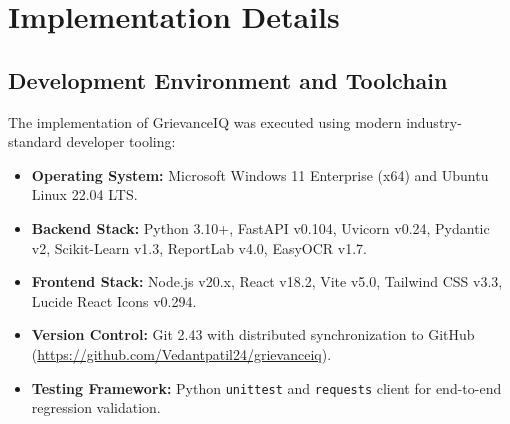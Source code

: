 \chapter{Implementation Details}

\section{Development Environment and Toolchain}
The implementation of GrievanceIQ was executed using modern industry-standard developer tooling:
\begin{itemize}
    \item \textbf{Operating System:} Microsoft Windows 11 Enterprise (x64) and Ubuntu Linux 22.04 LTS.
    \item \textbf{Backend Stack:} Python 3.10+, FastAPI v0.104, Uvicorn v0.24, Pydantic v2, Scikit-Learn v1.3, ReportLab v4.0, EasyOCR v1.7.
    \item \textbf{Frontend Stack:} Node.js v20.x, React v18.2, Vite v5.0, Tailwind CSS v3.3, Lucide React Icons v0.294.
    \item \textbf{Version Control:} Git 2.43 with distributed synchronization to GitHub (\url{https://github.com/Vedantpatil24/grievanceiq}).
    \item \textbf{Testing Framework:} Python \texttt{unittest} and \texttt{requests} client for end-to-end regression validation.
\end{itemize}

